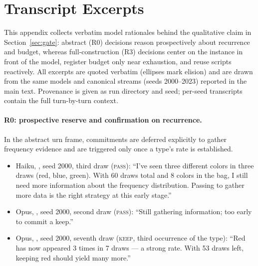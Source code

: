 \documentclass{article}
\begin{document}
\section{Transcript Excerpts} \label{app:transcripts}

This appendix collects verbatim model rationales behind the qualitative claim in Section~\ref{sec:gate}: abstract (R0) decisions reason prospectively about recurrence and budget, whereas full-construction (R3) decisions center on the instance in front of the model, register budget only near exhaustion, and reuse scripts reactively. All excerpts are quoted verbatim (ellipses mark elision) and are drawn from the same models and canonical streams (seeds 2000--2023) reported in the main text. Provenance is given as run directory and seed; per-seed transcripts contain the full turn-by-turn context.

\paragraph{R0: prospective reserve and confirmation on recurrence.} In the abstract urn frame, commitments are deferred explicitly to gather frequency evidence and are triggered only once a type's rate is established.
\begin{itemize}
\item Haiku, , seed 2000, third draw (\textsc{pass}): ``I've seen three different colors in three draws (red, blue, green). With 60 draws total and 8 colors in the bag, I still need more information about the frequency distribution. Passing to gather more data is the right strategy at this early stage.''
\item Opus, , seed 2000, second draw (\textsc{pass}): ``Still gathering information; too early to commit a keep.''
\item Opus, , seed 2000, seventh draw (\textsc{keep}, third occurrence of the type): ``Red has now appeared 3 times in 7 draws --- a strong rate. With 53 draws left, keeping red should yield many more.''
\end{itemize}
\end{document}

